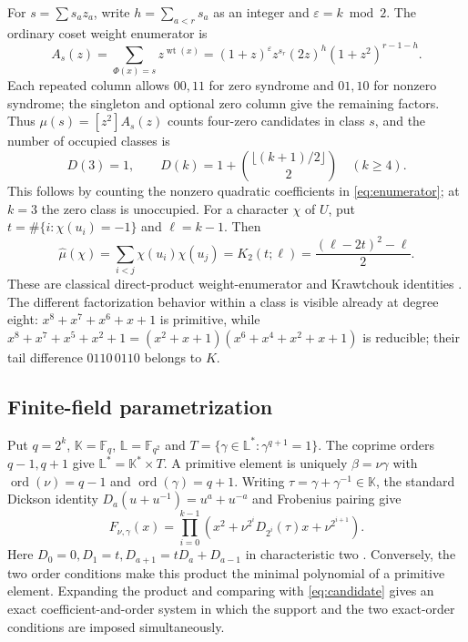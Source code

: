 \documentclass[11pt]{article}
\theoremstyle{definition}
\theoremstyle{remark}
\begin{document}
For $s=\sum s_a z_a$, write $h=\sum_{a<r}s_a$ as an integer and
$\varepsilon=k\bmod2$. The ordinary coset weight enumerator is
\begin{equation}\label{eq:enumerator}
 A_s(z)=\sum_{\Phi(x)=s}z^{\operatorname{wt}(x)}
       =(1+z)^\varepsilon z^{s_r}(2z)^h(1+z^2)^{r-1-h}.
\end{equation}
Each repeated column allows $00,11$ for zero syndrome and $01,10$
for nonzero syndrome; the singleton and optional zero column give the
remaining factors. Thus $\mu(s)=[z^2]A_s(z)$ counts four-zero candidates
in class $s$, and the number of occupied classes is
\begin{equation}\label{eq:Dk}
 D(3)=1,\qquad D(k)=1+\binom{\lfloor(k+1)/2\rfloor}{2}\quad(k\ge4).
\end{equation}
This follows by counting the nonzero quadratic coefficients in
\eqref{eq:enumerator}; at $k=3$ the zero class is unoccupied.
For a character $\chi$ of $U$, put
$t=\#\{i:\chi(u_i)=-1\}$ and $\ell=k-1$. Then
\begin{equation}\label{eq:krawtchouk}
 \widehat\mu(\chi)=\sum_{i<j}\chi(u_i)\chi(u_j)
   =K_2(t;\ell)=\frac{(\ell-2t)^2-\ell}{2}.
\end{equation}
These are classical direct-product weight-enumerator and Krawtchouk
identities \cite[Sections 3--4]{Forney11}\cite[Sections 1.1 and 2.1]{Brouwer18}.
The different factorization behavior within a class is visible already
at degree eight:
$x^8+x^7+x^6+x+1$ is primitive, while
$x^8+x^7+x^5+x^2+1=(x^2+x+1)(x^6+x^4+x^2+x+1)$ is reducible;
their tail difference $0110\,0110$ belongs to $K$.

\subsection{Finite-field parametrization}\label{sec:dickson}
Put $q=2^k$, $\mathbb K=\mathbb F_q$, $\mathbb L=\mathbb F_{q^2}$ and
$T=\{\gamma\in\mathbb L^*:\gamma^{q+1}=1\}$.
The coprime orders $q-1,q+1$ give $\mathbb L^*=\mathbb K^*\times T$.
A primitive element is uniquely $\beta=\nu\gamma$ with
$\operatorname{ord}(\nu)=q-1$ and $\operatorname{ord}(\gamma)=q+1$.
Writing $\tau=\gamma+\gamma^{-1}\in\mathbb K$, the standard Dickson
identity $D_a(u+u^{-1})=u^a+u^{-a}$ and Frobenius pairing give
\begin{equation}\label{eq:dickson}
 F_{\nu,\gamma}(x)=\prod_{i=0}^{k-1}
 \left(x^2+\nu^{2^i}D_{2^i}(\tau)x+\nu^{2^{i+1}}\right).
\end{equation}
Here $D_0=0,D_1=t,D_{a+1}=tD_a+D_{a-1}$ in characteristic two
\cite{LN}. Conversely, the two order conditions make this product the
minimal polynomial of a primitive element. Expanding the product and
comparing with \eqref{eq:candidate} gives an exact coefficient-and-order
system in which the support and the two exact-order conditions are
imposed simultaneously.
\end{document}

